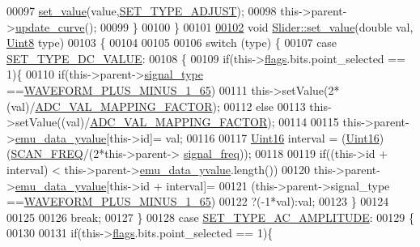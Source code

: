 \begin{DoxyCode}
00097     \hyperlink{a00077_ae3010d3de02715db2f443560d7d2a27b}{set\_value}(value,\hyperlink{a00090_a16b6b7b5ad68ec0dd62a3c9e97f88adb}{SET\_TYPE\_ADJUST});
00098     this->parent->\hyperlink{a00008_a15cbcf5f0a17281468800f47898f60c1}{update\_curve}();
00099     \}
00100 \}
00101 
\hypertarget{a00133_source_l00102}{}\hyperlink{a00077_ae3010d3de02715db2f443560d7d2a27b}{00102} \textcolor{keywordtype}{void} \hyperlink{a00077_ae3010d3de02715db2f443560d7d2a27b}{Slider::set\_value}(\textcolor{keywordtype}{double} val, \hyperlink{a00004_a979e3e23b9a449e69ab6a8a83b6042f8}{Uint8} type)
00103 \{
00104 
00105 
00106     \textcolor{keywordflow}{switch} (type) \{
00107     \textcolor{keywordflow}{case} \hyperlink{a00090_a347f6ec80828b93988d22989c0df015f}{SET\_TYPE\_DC\_VALUE}:
00108      \{
00109         \textcolor{keywordflow}{if}(this->\hyperlink{a00077_ade6449558d429b66e5ed1381bc9b9060}{flags}.bits.point\_selected == 1)\{
00110             \textcolor{keywordflow}{if}(this->parent->\hyperlink{a00008_a070edaec5aee6ba1f5a6866bc32c8ce4}{signal\_type} ==\hyperlink{a00090_a0923d3b365a36e1e8c401cec964aa36f}{WAVEFORM\_PLUS\_MINUS\_1\_65})
00111             this->setValue(2*(val)/\hyperlink{a00086_ada92d3eeeec0cbeee41e76a52d145792}{ADC\_VAL\_MAPPING\_FACTOR});
00112             \textcolor{keywordflow}{else}
00113             this->setValue((val)/\hyperlink{a00086_ada92d3eeeec0cbeee41e76a52d145792}{ADC\_VAL\_MAPPING\_FACTOR});
00114 
00115         this->parent->\hyperlink{a00008_ad922d05d1e988d84f404c115fe909f72}{emu\_data\_yvalue}[this->id]= val;
00116 
00117         \hyperlink{a00004_aae7407b021d43f7193a81a58cfb3e297}{Uint16} interval = (\hyperlink{a00004_aae7407b021d43f7193a81a58cfb3e297}{Uint16})(\hyperlink{a00086_a8127170b687c1f67a968886c128e76e4}{SCAN\_FREQ}/(2*this->parent->
      \hyperlink{a00008_a67039999d520fc483fab521fae5ddde4}{signal\_freq}));
00118 
00119         \textcolor{keywordflow}{if}((this->\textcolor{keywordtype}{id} + interval) < this->parent->\hyperlink{a00008_ad922d05d1e988d84f404c115fe909f72}{emu\_data\_yvalue}.length())
00120         this->parent->\hyperlink{a00008_ad922d05d1e988d84f404c115fe909f72}{emu\_data\_yvalue}[this->id + interval]=
00121         (this->parent->signal\_type ==\hyperlink{a00090_a0923d3b365a36e1e8c401cec964aa36f}{WAVEFORM\_PLUS\_MINUS\_1\_65})
00122         ?(-1*val):val;
00123         \}
00124 
00125 
00126         \textcolor{keywordflow}{break};
00127     \}
00128     \textcolor{keywordflow}{case} \hyperlink{a00090_a704f34d2cc6c149f96e9da9d2a1aa8c0}{SET\_TYPE\_AC\_AMPLITUDE}:
00129       \{
00130 
00131         \textcolor{keywordflow}{if}(this->\hyperlink{a00077_ade6449558d429b66e5ed1381bc9b9060}{flags}.bits.point\_selected == 1)\{

\end{DoxyCode}
